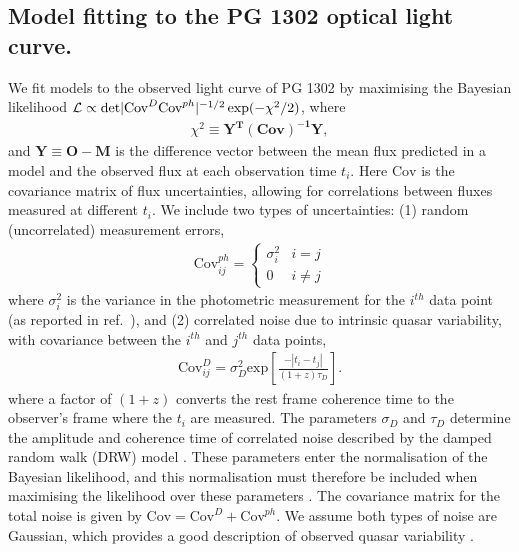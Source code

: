 \subsection{Model fitting to the PG 1302 optical light curve.}
%
We fit models to the observed light curve of PG 1302 by maximising the
Bayesian likelihood $\mathcal{L} \propto {\rm
  det}|{\mbox{Cov}^{D}}{\mbox{Cov}^{ph}}|^{-1/2}\exp(-\chi^2/2)$,
where
%
\begin{align}
\chi^2 \equiv \mathbf{Y^T} \mathbf{(\mbox{Cov})^{-1}}  \mathbf{Y},
\end{align}
%
and $\mathbf{Y} \equiv \mathbf{O} - \mathbf{M}$ is the difference
vector between the mean flux predicted in a model and the observed
flux at each observation time $t_i$. Here $\mbox{Cov}$ is the
covariance matrix of flux uncertainties, allowing for correlations
between fluxes measured at different $t_i$.  We include two types of
uncertainties: (1) random (uncorrelated) measurement errors,
%
\begin{align}
 \mbox{Cov}^{ph}_{ij} = 
 \begin{cases} 
      \sigma^2_i & i=j \\
      0 & i \neq j 
   \end{cases}
\end{align}
%
where $\sigma^2_i$ is the variance in the photometric measurement for the
$i^{th}$ data point (as reported in ref.~\cite{Graham+2015a}), and (2)
correlated noise due to intrinsic quasar variability, with covariance
between the $i^{th}$ and $j^{th}$ data points,
%
\begin{align}
\mbox{Cov}^{D}_{ij} = \sigma^2_{D} \mbox{exp}\left[ \frac{-|t_i - t_j|}{(1 + z) \tau_D}\right].
\end{align}
%
where a factor of $(1+z)$ converts the rest frame coherence time to
the observer's frame where the $t_i$ are measured.  The parameters
$\sigma_D$ and $\tau_D$ determine the amplitude and coherence time of
correlated noise described by the damped random walk (DRW)
model \cite{Kelly:2009:DRW}.  These parameters enter the normalisation
of the Bayesian likelihood, and this normalisation must therefore be
included when maximising the likelihood over these
parameters \cite{Kozlowski+2010}. The covariance matrix for the total
noise is given by $\mbox{Cov} = \mbox{Cov}^{D} + \mbox{Cov}^{ph}$. We
assume both types of noise are Gaussian, which provides a good
description of observed quasar variability \cite{Andrae+2013}.

